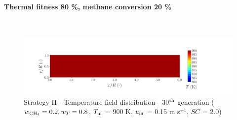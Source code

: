 \documentclass[preprint,12pt]{elsarticle}
\begin{document}
\paragraph{Thermal fitness 80 \%, methane conversion 20 \%} \hspace{0pt} \\
\noindent 


%

\begin{figure}[h!]
\centering
\includegraphics[width=190mm]{results/5Eq/20C_80T/GEN30-TFIELD.png}
\caption{\label{fig:5RES2080G30-TField} Strategy II - Temperature field distribution - 30$^{\rm{th}}$ generation ($w_{\rm{CH_4}} = 0.2, w_T = 0.8$, $T_{\rm{in}}$ = 900 K, $u_{\rm{in}}$ = 0.15 m s$^{-1}$, $SC$ = 2.0)}
\end{figure}

%
\end{document}
